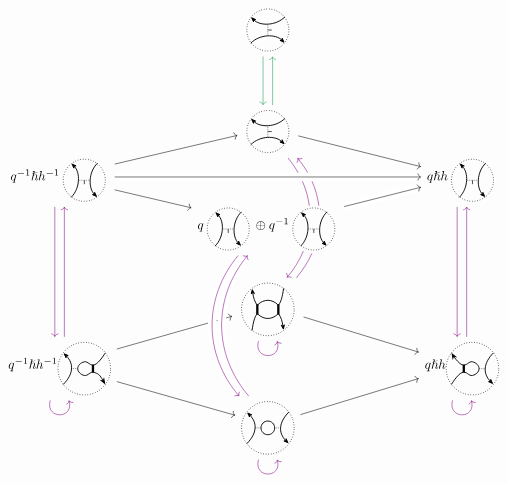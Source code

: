 \documentclass{article}
\DeclareMathOperator{\Res}{Res}
\theoremstyle{plain} %
\theoremstyle{definition} %
\theoremstyle{remark} %
\begin{document}
\[\label{r2bsdr}
\begin{tikzcd}[row sep=-0.1cm, column sep=2cm]
	&
	\scalebox{0.7}{\UnorientedVerticalThinEdge{}{}{}{}{+}}
	\arrow[d, color=ForestGreen, shift right=1.5]
	&
	\\[4em]&
	\scalebox{0.7}{\UnorientedVerticalThinEdge{}{}{}{}{+}}
	\arrow[dr]
	\arrow[ddd, bend left=40, color=violet, shift right=1.5, dash pattern=on 40pt off 35pt]
	\arrow[leftarrow, ddd, bend left=40, color=violet, shift left=1.5, dash pattern=on 39.5pt off 37pt]
	\arrow[u, color=ForestGreen, shift right=1.5]
	&
	\\
	q^{-1}\hslash h^{-1}\scalebox{0.7}{\UnorientedHorizontalThinEdge{}{}{}{}{-}} 
	\arrow[dr]
	\arrow[ur]
	\arrow[ddd, color=violet, shift right=1.5]
	&
	&
	q\hslash h\scalebox{0.7}{\UnorientedHorizontalThinEdge{}{}{}{}{-}}
	\arrow[ddd, color=violet, shift right=1.5]
	\\
	& 
	q\scalebox{0.7}{\UnorientedHorizontalThinEdge{}{}{}{}{-}}\oplus q^{-1}\scalebox{0.7}{\UnorientedHorizontalThinEdge{}{}{}{}{-}}
	\arrow[ur, crossing over] 
	&
	\\[2em]
	& 
	\scalebox{0.7}{\Square{}{}{}{}{}{}}
	\arrow[loop right, distance=1.5em, in=-75, out=-105, color=violet]
	\arrow[dr]
	&
	\\
	q^{-1}\hslash h^{-1}\scalebox{0.7}{\ThinThickUnoriented{}{}{}{}{}} 
	\arrow[loop right, distance=1.5em, in=-75, out=-105, color=violet]
	\arrow[ur]
	\arrow[dr]
	\arrow[uuu, color=violet, shift right=1.5]
	&& 
	q\hslash h\scalebox{0.7}{\ThickThinUnoriented{}{}{}{}{}}
	\arrow[uuu, color=violet, shift right=1.5]
	\arrow[loop right, distance=1.5em, in=-75, out=-105, color=violet]
	\\
	& 
	\scalebox{0.7}{\ThinThinUnoriented{}{}{}{}{}} 
	\arrow[ur]
	\arrow[loop right, distance=1.5em, in=-75, out=-105, color=violet] 
	&
	\arrow[ddd, from=4-2, to=7-2, bend right=40, crossing over, color=violet, shift right=1.5] 
	\arrow[uuu, from=7-2, to=4-2, bend left=40, crossing over, color=violet, shift right=1.5] 
	\arrow[ur, from=4-2, to=3-3, crossing over] 
	\arrow[rr, from=3-1, to=3-3, crossing over] 
\end{tikzcd}
\]





\end{document}
